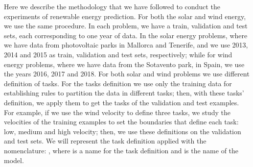 %
\begin{table}[t!]
    \caption{Hyperparameters, grids used to find them (when appropriate), and hyperparameter selection method for each model. Here, $d$ is the number of {dimensions} %
     of the data and $\sigma$ is the standard deviation of the~target.}
    \label{tab:hyperpars_grid_energies}
    \centering
\end{table}

Here we describe the methodology that we have followed to conduct the experiments of renewable energy prediction.
%
For both the solar and wind energy, we use the same procedure. In each problem, we have a train, validation and test sets, each corresponding to one year of data. In the solar energy problems, where we have data from photovoltaic parks in Mallorca and Tenerife, and we use 2013, 2014 and 2015 as train, validation and test sets, respectively; while for wind energy problems, where we have data from the Sotavento park, in Spain, we use the years 2016, 2017 and 2018.
%
For both solar and wind problems we use different definition of tasks. For the tasks definition we use only the training data for establishing rules to partition the data in different tasks; then, with these tasks' definition, we apply them to get the tasks of the validation and test examples.
%
For example, if we use the wind velocity to define three tasks, we study the velocities of the training examples to set the boundaries that define each task: low, medium and high velocity; then, we use these definitions on the validation and test sets.
%
We will represent the task definition applied with the nomenclature: , where  is a name for the task definition and  is the name of the model.


